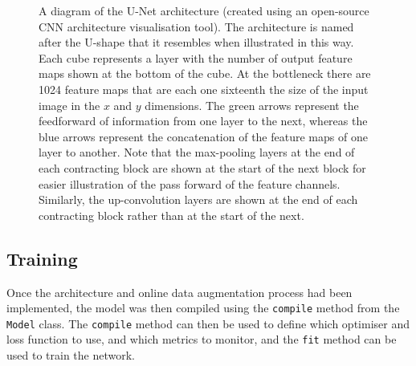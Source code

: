 \begin{figure}[!t]
    \centering
    \hspace*{-0.3cm}
    
    \caption[A diagram of the U-Net architecture (created using an open-source CNN architecture visualisation tool). The architecture is named after the U-shape that it resembles when illustrated in this way. Each cube represents a layer with the number of output feature maps shown at the bottom of the cube. At the bottleneck there are 1024 feature maps that are each one sixteenth the size of the input image in the $x$ and $y$ dimensions. The green arrows represent the feedforward of information from one layer to the next, whereas the blue arrows represent the concatenation of the feature maps of one layer to another. Note that the max-pooling layers at the end of each contracting block are shown at the start of the next block for easier illustration of the pass forward of the feature channels. Similarly, the up-convolution layers are shown at the end of each contracting block rather than at the start of the next.]{A diagram of the U-Net architecture (created using an open-source CNN architecture visualisation tool\footnotemark). The architecture is named after the U-shape that it resembles when illustrated in this way. Each cube represents a layer with the number of output feature maps shown at the bottom of the cube. At the bottleneck there are 1024 feature maps that are each one sixteenth the size of the input image in the $x$ and $y$ dimensions. The green arrows represent the feedforward of information from one layer to the next, whereas the blue arrows represent the concatenation of the feature maps of one layer to another. Note that the max-pooling layers at the end of each contracting block are shown at the start of the next block for easier illustration of the pass forward of the feature channels. Similarly, the up-convolution layers are shown at the end of each contracting block rather than at the start of the next.}
    \label{fig:unetushape}
\end{figure}

\subsection{Training}


Once the architecture and online data augmentation process had been implemented, the model was then compiled using the \texttt{compile} method from the \texttt{Model} class. The \texttt{compile} method can then be used to define which optimiser and loss function to use, and which metrics to monitor, and the \texttt{fit} method can be used to train the network.

